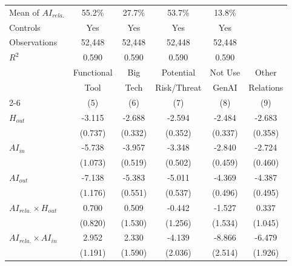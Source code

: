 \begin{table}[htbp]
\begin{threeparttable}
\begin{tabular}{l*{5}{c}}
\midrule
Mean of $AI_{rela.}$&      55.2\%         &      27.7\%         &      53.7\%         &      13.8\%         \\
Controls    &         Yes         &         Yes         &         Yes         &         Yes         \\
Observations&      52,448         &      52,448         &      52,448         &      52,448         \\
$R^2$       &       0.590         &       0.590         &       0.590         &       0.590         \\
\midrule
 & Functional & Big & Potential & Not Use & Other \\
 & Tool & Tech & Risk/Threat & GenAI & Relations \\
\cmidrule(lr){2-6}
 & (5) & (6) & (7) & (8) & (9) \\
\midrule
\midrule
$H_{out}$   &      -3.115\sym{***}&      -2.688\sym{***}&      -2.594\sym{***}&      -2.484\sym{***}&      -2.683\sym{***}\\
            &     (0.737)         &     (0.332)         &     (0.352)         &     (0.337)         &     (0.358)         \\
\addlinespace
$AI_{in}$   &      -5.738\sym{***}&      -3.957\sym{***}&      -3.348\sym{***}&      -2.840\sym{***}&      -2.724\sym{***}\\
            &     (1.073)         &     (0.519)         &     (0.502)         &     (0.459)         &     (0.460)         \\
\addlinespace
$AI_{out}$  &      -7.138\sym{***}&      -5.383\sym{***}&      -5.011\sym{***}&      -4.369\sym{***}&      -4.387\sym{***}\\
            &     (1.176)         &     (0.551)         &     (0.537)         &     (0.496)         &     (0.495)         \\
\addlinespace
$AI_{rela.} \times H_{out}$&       0.700         &       0.509         &      -0.442         &      -1.527         &       0.337         \\
            &     (0.820)         &     (1.530)         &     (1.256)         &     (1.534)         &     (1.045)         \\
\addlinespace
$AI_{rela.} \times AI_{in}$&       2.952\sym{**} &       2.330         &      -4.139\sym{**} &      -8.866\sym{***}&      -6.479\sym{***}\\
            &     (1.191)         &     (1.590)         &     (2.036)         &     (2.514)         &     (1.926)         \\

\end{tabular}
\end{threeparttable}
\end{table}
